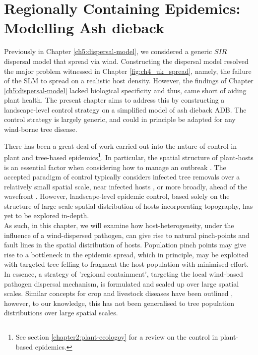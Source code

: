 \chapter{Regionally Containing Epidemics: Modelling Ash dieback}



Previously in Chapter \ref{ch5:dispersal-model}, we considered a generic $SIR$ dispersal model that spread via wind. Constructing the dispersal model resolved the major problem witnessed in Chapter \ref{fig:ch4_uk_spread}, namely, the failure of the SLM to spread on a realistic host density. However, the findings of Chapter \ref{ch5:dispersal-model} lacked biological specificity and thus, came short of aiding plant health. The present chapter aims to address this by constructing a landscape-level control strategy on a simplified model of ash dieback ADB. The control strategy is largely generic, and could in principle be adapted for any wind-borne tree disease.

There has been a great deal of work carried out into the nature of control in plant and tree-based epidemics\footnote{See section \ref{chapter2:plant-ecologoy} for a review on the control in plant-based epidemics.}. In particular, the spatial structure of plant-hosts is an essential factor when considering how to manage an outbreak \cite{spatial-control-optimisation, control-heterogeneous-landscapes}. The accepted paradigm of control typically considers infected tree removals over a relatively small spatial scale, near infected hosts \cite{WEBIDEMICS}, or more broadly, ahead of the wavefront \cite{large-scale-control}. However, landscape-level epidemic control, based solely on the structure of large-scale spatial distribution of hosts incorporating topography, has yet to be explored in-depth.\\

As such, in this chapter, we will examine how host-heterogeneity, under the influence of a wind-dispersed pathogen, can give rise to natural pinch-points and fault lines in the spatial distribution of hosts. Population pinch points may give rise to a bottleneck in the epidemic spread, which in principle, may be exploited with targeted tree felling to fragment the host population with minimised effort. In essence, a strategy of 'regional containment', targeting the local wind-based pathogen dispersal mechanism, is formulated and scaled up over large spatial scales. Similar concepts for crop and livestock diseases have been outlined \cite{PAPAIX201435, GILIOLI20131, Gilligan-disease-management}, however, to our knowledge, this has not been generalised to tree population distributions over large spatial scales.

